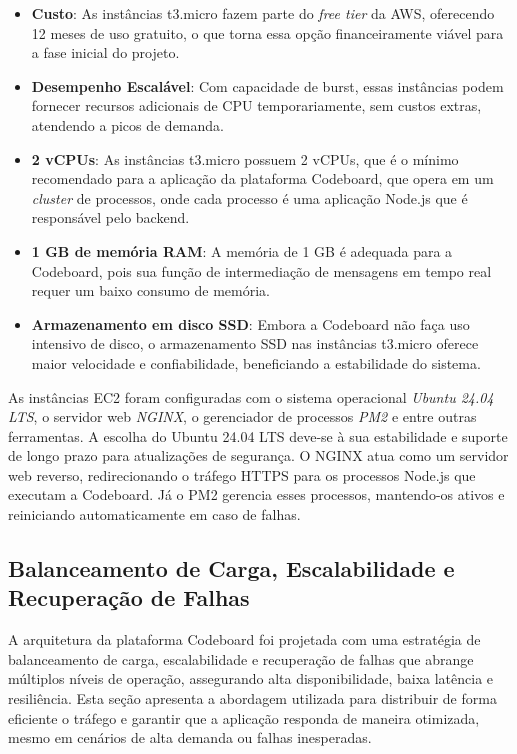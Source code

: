 \begin{itemize}
    \item \textbf{Custo}: As instâncias t3.micro fazem parte do \emph{free tier} da AWS, oferecendo 12 meses de uso gratuito, o que torna essa opção financeiramente viável para a fase inicial do projeto.
    \item \textbf{Desempenho Escalável}: Com capacidade de burst, essas instâncias podem fornecer recursos adicionais de CPU temporariamente, sem custos extras, atendendo a picos de demanda.
    \item \textbf{2 vCPUs}: As instâncias t3.micro possuem 2 vCPUs, que é o mínimo recomendado para a aplicação da plataforma Codeboard, que opera em um \emph{cluster} de processos, onde cada processo é uma aplicação Node.js que é responsável pelo backend.
    \item \textbf{1 GB de memória RAM}: A memória de 1 GB é adequada para a Codeboard, pois sua função de intermediação de mensagens em tempo real requer um baixo consumo de memória.
    \item \textbf{Armazenamento em disco SSD}: Embora a Codeboard não faça uso intensivo de disco, o armazenamento SSD nas instâncias t3.micro oferece maior velocidade e confiabilidade, beneficiando a estabilidade do sistema.
\end{itemize}

As instâncias EC2 foram configuradas com o sistema operacional \emph{Ubuntu 24.04 LTS}, o servidor web \emph{NGINX}, o gerenciador de processos \emph{PM2} e entre outras ferramentas. A escolha do Ubuntu 24.04 LTS deve-se à sua estabilidade e suporte de longo prazo para atualizações de segurança. O NGINX atua como um servidor web reverso, redirecionando o tráfego HTTPS para os processos Node.js que executam a Codeboard. Já o PM2 gerencia esses processos, mantendo-os ativos e reiniciando automaticamente em caso de falhas.

\subsection{Balanceamento de Carga, Escalabilidade e Recuperação de Falhas}

A arquitetura da plataforma Codeboard foi projetada com uma estratégia de balanceamento de carga, escalabilidade e recuperação de falhas que abrange múltiplos níveis de operação, assegurando alta disponibilidade, baixa latência e resiliência. Esta seção apresenta a abordagem utilizada para distribuir de forma eficiente o tráfego e garantir que a aplicação responda de maneira otimizada, mesmo em cenários de alta demanda ou falhas inesperadas.

